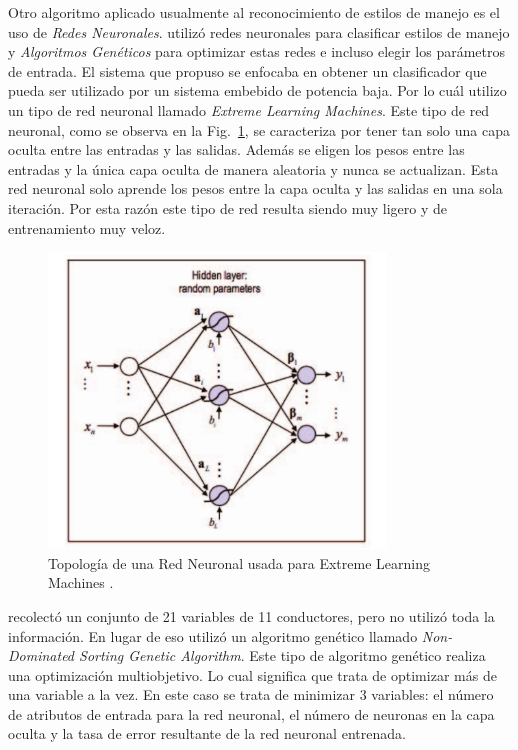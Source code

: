 Otro algoritmo aplicado usualmente al reconocimiento de estilos de manejo es el uso de {\it Redes Neuronales}. \citeauthor{7727682} \cite{7727682} utilizó redes neuronales para clasificar estilos de manejo y {\it Algoritmos Genéticos} para optimizar estas redes e incluso elegir los parámetros de entrada. El sistema que propuso se enfocaba en obtener un clasificador que pueda ser utilizado por un sistema embebido de potencia baja. Por lo cuál utilizo un tipo de red neuronal llamado {\it Extreme Learning Machines}. Este tipo de red neuronal, como se observa en la Fig.~\ref{fig:2.6}, se caracteriza por tener tan solo una capa oculta entre las entradas y las salidas. Además se eligen los pesos entre las entradas y la única capa oculta de manera aleatoria y nunca se actualizan. Esta red neuronal solo aprende los pesos entre la capa oculta y las salidas en una sola iteración. Por esta razón este tipo de red resulta siendo muy ligero y de entrenamiento muy veloz.

\begin{figure}[htpb!]
\centering
\includegraphics[width=0.8\textwidth]{Fig6}
\caption[Topología de una Red Neuronal usada para Extreme Learning Machines]{Topología de una Red Neuronal usada para Extreme Learning Machines \cite{7727682}.}
\label{fig:2.6}
\end{figure}

\citeauthor{7727682} recolectó un conjunto de 21 variables de 11 conductores, pero no utilizó toda la información. En lugar de eso utilizó un algoritmo genético llamado {\it Non-Dominated Sorting Genetic Algorithm}. Este tipo de algoritmo genético realiza una optimización multiobjetivo. Lo cual significa que trata de optimizar más de una variable a la vez. En este caso se trata de minimizar 3 variables: el número de atributos de entrada para la red neuronal, el número de neuronas en la capa oculta y la tasa de error resultante de la red neuronal entrenada.

